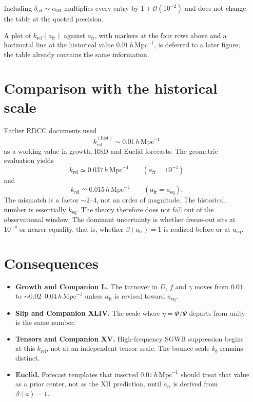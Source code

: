 \documentclass[11pt,a4paper]{article}
\begin{document}
Including \(\delta_{\mathrm{rel}}\sim\alpha_{\mathrm{IR}}\) multiplies every
entry by \(1+\mathcal{O}(10^{-2})\) and does not change the table at the
quoted precision.

A plot of \(k_{\mathrm{rel}}(a_{\mathrm{fr}})\) against \(a_{\mathrm{fr}}\),
with markers at the four rows above and a horizontal line at the historical
value \(0.01\,h\,\mathrm{Mpc}^{-1}\), is deferred to a later figure; the
table already contains the same information.

\section{Comparison with the historical scale}

Earlier RDCC documents used
\begin{equation}
  k_{\mathrm{rel}}^{\mathrm{(hist)}}
  \sim
  0.01\,h\,\mathrm{Mpc}^{-1}
\end{equation}
as a working value in growth, RSD and Euclid forecasts. The geometric
evaluation yields
\begin{equation}
  k_{\mathrm{rel}}
  \simeq
  0.037\,h\,\mathrm{Mpc}^{-1}
  \qquad
  (a_{\mathrm{fr}}=10^{-4})
\end{equation}
and
\begin{equation}
  k_{\mathrm{rel}}
  \simeq
  0.015\,h\,\mathrm{Mpc}^{-1}
  \qquad
  (a_{\mathrm{fr}}=a_{\mathrm{eq}}).
\end{equation}
The mismatch is a factor \(\sim2\)--\(4\), not an order of magnitude. The
historical number is essentially \(k_{\mathrm{eq}}\). The theory therefore
does not fall out of the observational window. The dominant uncertainty is
whether freeze-out sits at \(10^{-4}\) or nearer equality, that is, whether
\(\beta(a_{\mathrm{fr}})=1\) is realized before or at \(a_{\mathrm{eq}}\).

\section{Consequences}

\begin{itemize}[leftmargin=0.8cm]
  \item \textbf{Growth and Companion L.}
        The turnover in \(D\), \(f\) and \(\gamma\) moves from
        \(0.01\) to \(\sim0.02\)--\(0.04\,h\,\mathrm{Mpc}^{-1}\) unless
        \(a_{\mathrm{fr}}\) is revised toward \(a_{\mathrm{eq}}\).
  \item \textbf{Slip and Companion XLIV.}
        The scale where \(\eta=\Phi/\Psi\) departs from unity is the same
        number.
  \item \textbf{Tensors and Companion XV.}
        High-frequency SGWB suppression begins at this \(k_{\mathrm{rel}}\),
        not at an independent tensor scale. The bounce scale \(k_b\) remains
        distinct.
  \item \textbf{Euclid.}
        Forecast templates that inserted \(0.01\,h\,\mathrm{Mpc}^{-1}\) should
        treat that value as a prior center, not as the XII prediction, until
        \(a_{\mathrm{fr}}\) is derived from \(\beta(a)=1\).
\end{itemize}
\end{document}
